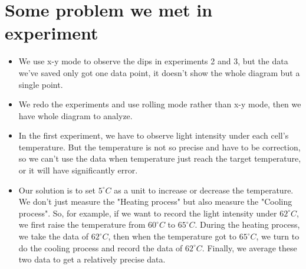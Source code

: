\section{Some problem we met in experiment}
\begin{itemize}
    \item[Q1.] We use x-y mode to observe the dips in experiments 2 and 3, but the data we've saved only got one data point, it doesn't show the whole diagram but a single point.
    \item[A1.] We redo the experiments and use rolling mode rather than x-y mode, then we have whole diagram to analyze.

    \item[Q2.] In the first experiment, we have to observe light intensity under each cell's temperature. But the temperature is not so precise and have to be correction, so we can't use the data when temperature just reach the target temperature, or it will have significantly error.
    \item[A2.] Our solution is to set $5^\circ C$ as a unit to increase or decrease the temperature. We don't just measure the "Heating process" but also measure the "Cooling process".
    So, for example, if we want to record the light intensity under $62^\circ C$, we first raise the temperature from $60^\circ C$ to $65^\circ C$. During the heating process, we take the data of $62^\circ C$, then when the temperature got to $65^\circ C$, we turn to do the cooling process and record the data of $62^\circ C$. Finally, we average these two data to get a relatively precise data.
\end{itemize}

